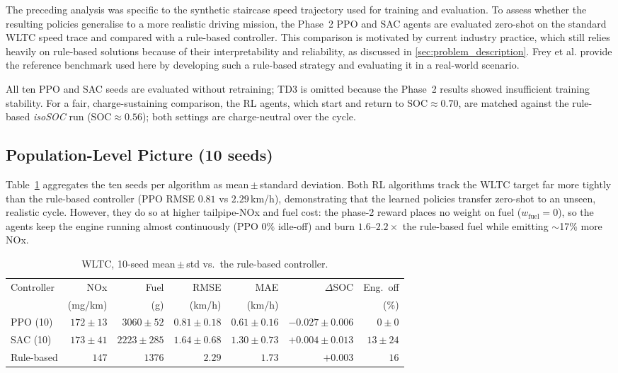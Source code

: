 The preceding analysis was specific to the synthetic staircase speed trajectory used for training and evaluation. To assess whether the resulting policies generalise to a more realistic driving mission, the Phase~2 PPO and SAC agents are evaluated zero-shot on the standard \ac{WLTC} speed trace and compared with a rule-based controller. This comparison is motivated by current industry practice, which still relies heavily on rule-based solutions because of their interpretability and reliability, as discussed in \autoref{sec:problem_description}. Frey et al. provide the reference benchmark used here by developing such a rule-based strategy and evaluating it in a real-world scenario.

All ten PPO and SAC seeds are evaluated without retraining; TD3 is omitted because the Phase~2 results showed insufficient training stability. For a fair, charge-sustaining comparison, the \ac{RL} agents, which start and return to $\mathrm{SOC}\approx0.70$, are matched against the rule-based \emph{isoSOC} run ($\mathrm{SOC}\approx0.56$); both settings are charge-neutral over the cycle.

\subsection{Population-Level Picture (10 seeds)}

Table~\ref{tab:wltc-mean} aggregates the ten seeds per algorithm as
mean\,$\pm$\,standard deviation. Both RL algorithms track the WLTC target far
more tightly than the rule-based controller (PPO RMSE $0.81$ vs $2.29$\,km/h),
demonstrating that the learned policies transfer zero-shot to an unseen, realistic
cycle. However, they do so at higher tailpipe-NOx and fuel cost: the
phase-2 reward places no weight on fuel ($w_\text{fuel}=0$), so the agents keep
the engine running almost continuously (PPO $0\%$ idle-off) and burn
$1.6$--$2.2\times$ the rule-based fuel while emitting $\sim$17\% more NOx.

\begin{table}[H]
  \centering
  \small
  \begin{tabular}{lrrrrrr}
    \toprule
    Controller & NOx & Fuel & RMSE & MAE & $\Delta$SOC & Eng.\ off \\
    & (mg/km) & (g) & (km/h) & (km/h) & & (\%) \\
    \midrule
    PPO (10)   & $172\pm13$ & $3060\pm52$  & $0.81\pm0.18$ & $0.61\pm0.16$ & $-0.027\pm0.006$ & $0\pm0$  \\
    SAC (10)   & $173\pm41$ & $2223\pm285$ & $1.64\pm0.68$ & $1.30\pm0.73$ & $+0.004\pm0.013$ & $13\pm24$ \\
    Rule-based & $147$      & $1376$       & $2.29$        & $1.73$        & $+0.003$         & $16$ \\
    \bottomrule
  \end{tabular}
  \caption[WLTC 10-seed mean comparison]{WLTC, 10-seed mean\,$\pm$\,std vs.\ the rule-based controller.}
  \label{tab:wltc-mean}
\end{table}

